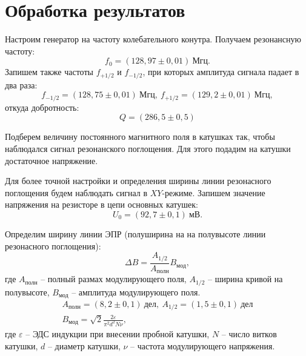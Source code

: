 \documentclass[a4paper,12pt]{article} %
\begin{document}
	
	
	\newpage
	\section{Обработка результатов}
		Настроим генератор на частоту колебательного конутра. Получаем резонансную частоту:
		\begin{equation*}
			f_0 = (128,97 \pm 0,01) \ \text{Мгц}.
		\end{equation*}
		Запишем также частоты $f_{+1/2}$ и $f_{-1/2}$, при которых амплитуда сигнала падает в два раза:
		\begin{equation*}
			f_{-1/2} = (128,75\pm 0,01) \ \text{Мгц}, \ f_{+1/2} = (129,2 \pm 0,01)\ \text{Мгц},
		\end{equation*}
		откуда добротность:
		\begin{equation*}
			Q = (286,5 \pm 0,5)
		\end{equation*}
	
		Подберем величину постоянного магнитного поля в катушках так, чтобы наблюдался сигнал резонанского поглощения. Для этого подадим на катушки достаточное напряжение.
		
		Для более точной настройки и определения ширины линии резонасного поглощения будем наблюдать сигнал в $XY$-режиме. Запишем значение напряжения на резисторе в цепи основных катушек:
		\begin{equation*}
			U_0 = (92,7 \pm 0,1) \ \text{мВ}.
		\end{equation*}
	
		Определим ширину линии ЭПР (полуширина на на полувысоте линии резонасного поглощения):
		\begin{equation*}
			\Delta B = \frac{A_{1/2}}{A_{\text{полн}}}B_\text{мод},
		\end{equation*}
		где $A_\text{полн}$ -- полный размах модулирующего поля, $A_{1/2}$ -- ширина кривой на полувысоте, $B_\text{мод}$ -- амплитуда модулирующего поля.
		\begin{equation*}
			\begin{gathered}
				A_\text{полн} = (8,2 \pm 0,1 ) \ \text{дел}, \ A_{1/2} = (1,5 \pm 0,1) \ \text{дел} \\
				B_\text{мод} = \sqrt{2} \frac{2\varepsilon}{\pi^2d^2N\nu},
			\end{gathered}
		\end{equation*}
		где $\varepsilon$ -- ЭДС индукции при внесении пробной катушки, $N$ -- число витков катушки, $d$ -- диаметр катушки, $\nu$ -- частота модулирующего напряжения.
		
\end{document}
